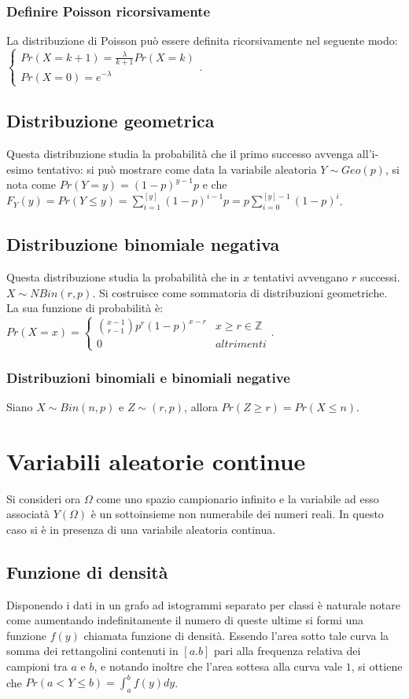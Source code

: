 \subsubsection{Definire Poisson ricorsivamente}
La distribuzione di Poisson pu\`o essere definita ricorsivamente nel seguente modo: $\begin{cases}Pr(X=k+1)=\frac{\lambda}{k+1}Pr(X=k)\\Pr(X=0)=e^{-\lambda}\end{cases}$.
\subsection{Distribuzione geometrica}
Questa distribuzione studia la probabilit\`a che il primo successo avvenga all'i-esimo tentativo: si pu\`o mostrare come data la variabile aleatoria $Y\sim Geo(p)$, si nota 
come $Pr(Y=y)=(1-p)^{y-1}p$ e che $F_Y(y)=Pr(Y\le y)=\sum\limits_{i=1}^{[y]}(1-p)^{i-1}p=p\sum\limits_{i=0}^{[y]-1}(1-p)^i$. 
\subsection{Distribuzione binomiale negativa}
Questa distribuzione studia la probabilit\`a che in $x$ tentativi avvengano $r$ successi. $X\sim NBin(r, p)$. Si costruisce come sommatoria di distribuzioni geometriche. La sua
funzione di probabilit\`a \`e:\\ $Pr(X=x)=\begin{cases}\binom{x-1}{r-1}p^r(1-p)^{x-r}&x\ge r\in\mathbb{Z}\\0&altrimenti\end{cases}$.
\subsubsection{Distribuzioni binomiali e binomiali negative}
Siano $X\sim Bin(n,p)$ e $Z\sim(r,p)$, allora $Pr(Z\ge r)=Pr(X\le n)$.
\section{Variabili aleatorie continue}
Si consideri ora $\Omega$ come uno spazio campionario infinito e la variabile ad esso associat\`a $Y(\Omega)$ \`e un sottoinsieme non numerabile dei numeri reali. In questo 
caso si \`e in presenza di una variabile aleatoria continua. 
\subsection{Funzione di densit\`a}
Disponendo i dati in un grafo ad istogrammi separato per classi \`e naturale notare come aumentando indefinitamente il numero di queste ultime si formi una funzione $f(y)$ 
chiamata funzione di densit\`a. Essendo l'area sotto tale curva la somma dei rettangolini contenuti in $[a.b]$ pari alla frequenza relativa dei campioni tra $a$ e $b$, e
notando inoltre che l'area sottesa alla curva vale $1$, si ottiene che $Pr(a<Y\le b)=\int_a^bf(y)dy$. 
